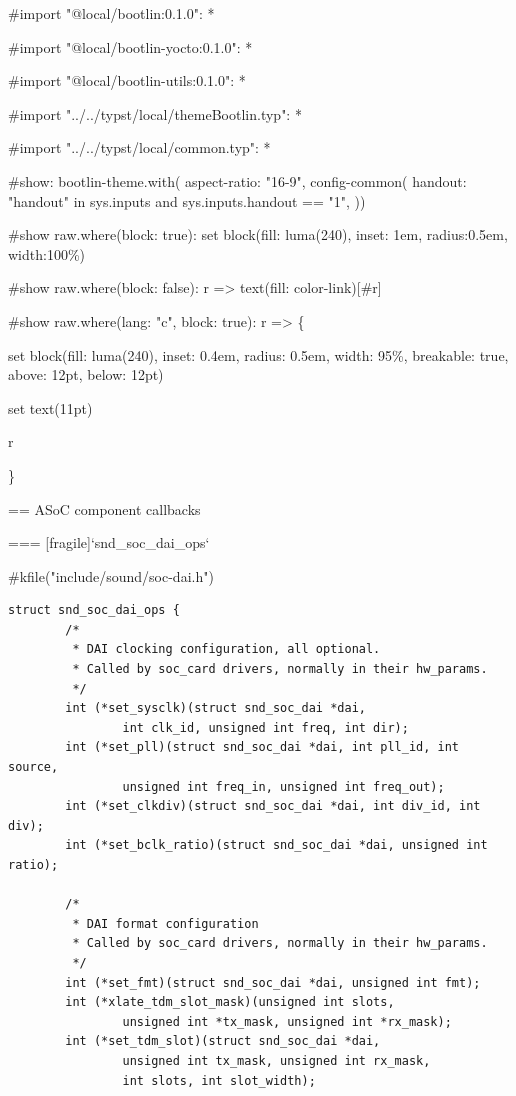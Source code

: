 #import "@local/bootlin:0.1.0": * 

#import "@local/bootlin-yocto:0.1.0": *

#import "@local/bootlin-utils:0.1.0": *

#import "../../typst/local/themeBootlin.typ": *

#import "../../typst/local/common.typ": *

#show: bootlin-theme.with(
  aspect-ratio: "16-9",
config-common(
  handout: "handout" in sys.inputs and sys.inputs.handout == "1",
))

#show raw.where(block: true): set block(fill: luma(240), inset: 1em, radius:0.5em, width:100\%) 

#show raw.where(block: false): r => { text(fill: color-link)[#r] } 

#show raw.where(lang: "c", block: true): r => \{

set block(fill: luma(240),
inset: 0.4em,
radius: 0.5em,
width: 95\%, breakable: true, above: 12pt, below: 12pt)

set text(11pt)

r

\} 

== ASoC component callbacks

=== [fragile]{`snd_soc_dai_ops`}
  \begin{block}{#kfile("include/sound/soc-dai.h")}
    \fontsize{9}{9}\selectfont
    \begin{verbatim}
struct snd_soc_dai_ops {
        /*
         * DAI clocking configuration, all optional.
         * Called by soc_card drivers, normally in their hw_params.
         */
        int (*set_sysclk)(struct snd_soc_dai *dai,
                int clk_id, unsigned int freq, int dir);
        int (*set_pll)(struct snd_soc_dai *dai, int pll_id, int source,
                unsigned int freq_in, unsigned int freq_out);
        int (*set_clkdiv)(struct snd_soc_dai *dai, int div_id, int div);
        int (*set_bclk_ratio)(struct snd_soc_dai *dai, unsigned int ratio);

        /*
         * DAI format configuration
         * Called by soc_card drivers, normally in their hw_params.
         */
        int (*set_fmt)(struct snd_soc_dai *dai, unsigned int fmt);
        int (*xlate_tdm_slot_mask)(unsigned int slots,
                unsigned int *tx_mask, unsigned int *rx_mask);
        int (*set_tdm_slot)(struct snd_soc_dai *dai,
                unsigned int tx_mask, unsigned int rx_mask,
                int slots, int slot_width);
    \end{verbatim}
  \end{block}



